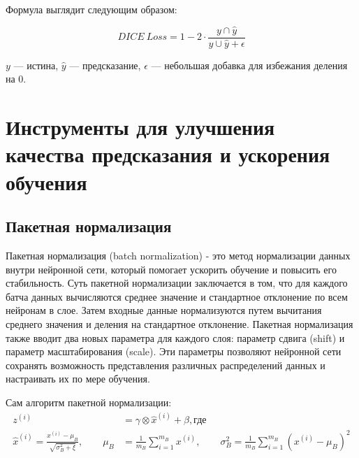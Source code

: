 Формула выглядит следующим образом:

\begin{equation}
	DICE \: Loss = 1 - 2 \cdot \frac{y \cap \hat{y}}{y \cup \hat{y} + \epsilon}
\end{equation}

\noindent $y$ --- истина, $\hat{y}$ --- предсказание, $\epsilon$ --- небольшая
добавка для избежания деления на 0.

\section{Инструменты для улучшения качества предсказания и ускорения обучения}

\subsection{Пакетная нормализация}

Пакетная нормализация (batch normalization) - это метод нормализации данных
внутри нейронной сети, который помогает ускорить обучение и повысить его
стабильность. Суть пакетной нормализации заключается в том, что для каждого
батча данных вычисляются среднее значение и стандартное отклонение по всем
нейронам в слое. Затем входные данные нормализуются путем вычитания среднего
значения и деления на стандартное отклонение. Пакетная нормализация также
вводит два новых параметра для каждого слоя: параметр сдвига (shift) и параметр
масштабирования (scale). Эти параметры позволяют нейронной сети сохранять
возможность представления различных распределений данных и настраивать их по
мере обучения.

Сам алгоритм пакетной нормализации:
\begin{align*}
	z^{(i)} & = \gamma \otimes \hat x^{(i)} + \beta, \text{где}        \\
	\hat x^{(i)} = \frac{x^{(i)} - \mu_B}{\sqrt{\sigma^2_B + \xi}}, \qquad
	\mu_B   & = \frac{1}{m_B} \sum\limits_{i = 1}^{m_B}x^{(i)}, \qquad
	\sigma_B^2 = \frac{1}{m_B} \sum\limits_{i = 1}^{m_B}(x^{(i)} - \mu_B)^2
\end{align*}

